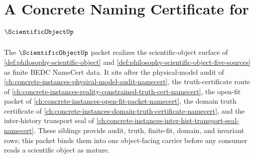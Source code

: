 \chapter{A Concrete Naming Certificate for $\ScientificObjectUp$}
\label{ch:concrete-instances-scientificobject-namecert}

The $\ScientificObjectUp$ packet realizes the scientific-object surface of \autoref{def:philosophy-scientific-object} and \autoref{def:philosophy-scientific-object-five-sources} as finite BEDC NameCert data. It sits after the physical-model audit of \autoref{ch:concrete-instances-physical-model-audit-namecert}, the truth-certificate route of \autoref{ch:concrete-instances-reality-constrained-truth-cert-namecert}, the open-fit packet of \autoref{ch:concrete-instances-open-fit-packet-namecert}, the domain truth certificate of \autoref{ch:concrete-instances-domain-truth-certificate-namecert}, and the inter-history transport seal of \autoref{ch:concrete-instances-inter-hist-transport-seal-namecert}. These siblings provide audit, truth, finite-fit, domain, and invariant rows; this packet binds them into one object-facing carrier before any consumer reads a scientific object as mature.


